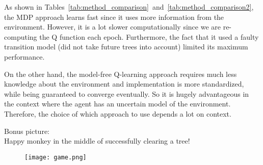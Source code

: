 \documentclass[11pt]{article}
\begin{document}
As shown in Tables~\ref{tab:method_comparison}~and~\ref{tab:method_comparison2}, the MDP approach learns fast since it uses more information from the environment. However, it is a lot slower computationally since we are re-computing the Q function each epoch. Furthermore, the fact that it used a faulty transition model (did not take future trees into account) limited its maximum performance. 

On the other hand, the model-free Q-learning approach requires much less knowledge about the environment and implementation is more standardized, while being guaranteed to converge eventually. So it is hugely advantageous in the context where the agent has an uncertain model of the environment. Therefore, the choice of which approach to use depends a lot on context.


\newpage

Bonus picture: \\
Happy monkey in the middle of successfully clearing a tree!
\begin{figure}[htp]
\centering
\texttt{[image: game.png]}
\label{fig:happymonkey}
\end{figure}
\end{document}
